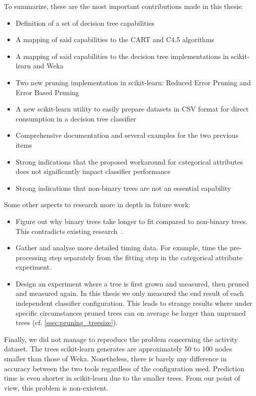 To summarize, these are the most important contributions made in this thesis:
\begin{itemize}
    \item Definition of a set of decision tree capabilities
    \item A mapping of said capabilities to the CART and C4.5 algorithms 
    \item A mapping of said capabilities to the decision tree implementations in scikit-learn and Weka
    \item Two new pruning implementation in scikit-learn: Reduced Error Pruning and Error Based Pruning
    \item A new scikit-learn utility to easily prepare datasets in CSV format for direct consumption in a decision tree classifier
    \item Comprehensive documentation and several examples for the two previous items
    \item Strong indications that the proposed workaround for categorical attributes does not significantly impact classifier performance
    \item Strong indications that non-binary trees are not an essential capability
\end{itemize}

Some other aspects to research more in depth in future work:
\begin{itemize}
    \item Figure out why binary trees take longer to fit compared to non-binary trees. This contradicts existing research~\cite{elomaa1999general}.
    \item Gather and analyse more detailed timing data. For example, time the pre-processing step separately from the fitting step in the categorical attribute experiment.
    \item Design an experiment where a tree is first grown and measured, then pruned and measured again. In this thesis we only measured the end result of each independent classifier configuration. This leads to strange results where under specific circumstances pruned trees can on average be larger than unpruned trees (cf. \autoref{ssec:pruning_treesize}).
\end{itemize}

Finally, we did not manage to reproduce the problem concerning the activity dataset. The trees scikit-learn generates are approximately 50 to 100 nodes smaller than those of Weka. Nonetheless, there is barely any difference in accuracy between the two tools regardless of the configuration used. Prediction time is even shorter in scikit-learn due to the smaller trees. From our point of view, this problem is non-existent.
